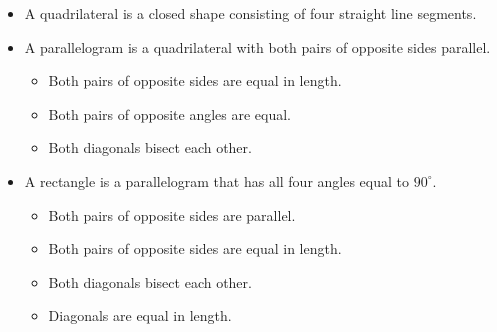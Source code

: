 \begin{itemize}
\item A quadrilateral is a closed shape consisting of four straight line segments.
\item A parallelogram is a quadrilateral with both pairs of opposite sides parallel.
\begin{itemize}
\item Both pairs of opposite sides are equal in length.
\item Both pairs of opposite angles are equal.
\item Both diagonals bisect each other.
\end{itemize}
\item A rectangle is a parallelogram that has all four angles equal to $90^\circ$.
\begin{itemize}
\item  Both pairs of opposite sides are parallel.
\item Both pairs of opposite sides are equal in length.
\item Both diagonals bisect each other.
\item Diagonals are equal in length.


\end{itemize}
\end{itemize}
